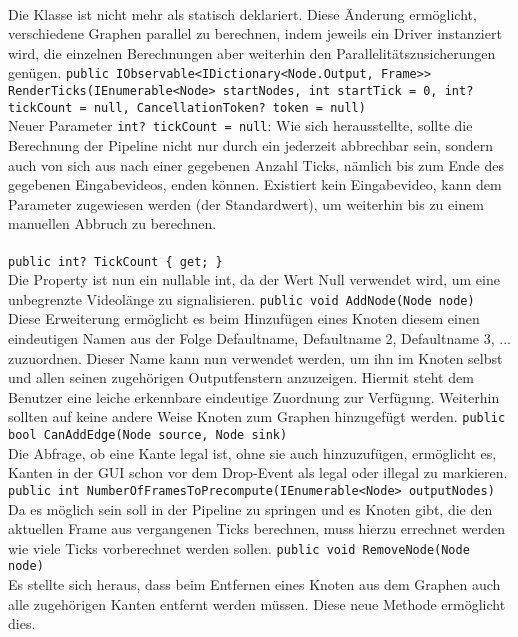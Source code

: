 \paragraph{}
\begin{itemize}
	\change Die Klasse ist nicht mehr als statisch deklariert. Diese Änderung ermöglicht, verschiedene Graphen parallel zu berechnen, indem jeweils ein Driver instanziert wird, die einzelnen Berechnungen aber weiterhin den Parallelitätszusicherungen genügen.
	\add \verb!public IObservable<IDictionary<Node.Output, Frame>> RenderTicks(IEnumerable<Node> startNodes, int startTick = 0, int? tickCount = null, CancellationToken? token = null)! \\
	Neuer Parameter \verb!int? tickCount = null!: Wie sich herausstellte, sollte die Berechnung der Pipeline nicht nur durch ein  jederzeit abbrechbar sein, sondern auch von sich aus nach einer gegebenen Anzahl Ticks, nämlich bis zum Ende des gegebenen Eingabevideos, enden können. Existiert kein Eingabevideo, kann dem Parameter  zugewiesen werden (der Standardwert), um weiterhin bis zu einem manuellen Abbruch zu berechnen.
\end{itemize}

\paragraph{}
\begin{itemize}
	\change \verb!public int? TickCount { get; }! \\
	Die Property ist nun ein nullable int, da der Wert Null verwendet wird, um eine unbegrenzte Videolänge zu signalisieren.
	\add \verb!public void AddNode(Node node)! \\
	Diese Erweiterung ermöglicht es beim Hinzufügen eines Knoten diesem einen eindeutigen Namen aus der Folge Defaultname, Defaultname 2, Defaultname 3, ... zuzuordnen. Dieser Name kann nun verwendet werden, um ihn im Knoten selbst und allen seinen zugehörigen Outputfenstern anzuzeigen. Hiermit steht dem Benutzer eine leiche erkennbare eindeutige Zuordnung zur Verfügung. Weiterhin sollten auf keine andere Weise Knoten zum Graphen hinzugefügt werden.
	\add \verb!public bool CanAddEdge(Node source, Node sink)! \\
	Die Abfrage, ob eine Kante legal ist, ohne sie auch hinzuzufügen, ermöglicht es, Kanten in der GUI schon vor dem Drop-Event als legal oder illegal zu markieren.
	\add \verb!public int NumberOfFramesToPrecompute(IEnumerable<Node> outputNodes)! \\
	Da es möglich sein soll in der Pipeline zu springen und es Knoten gibt, die den aktuellen Frame aus vergangenen Ticks berechnen, muss hierzu errechnet werden wie viele Ticks vorberechnet werden sollen.
	\add \verb!public void RemoveNode(Node node)! \\
	Es stellte sich heraus, dass beim Entfernen eines Knoten aus dem Graphen auch alle zugehörigen Kanten entfernt werden müssen. Diese neue Methode ermöglicht dies.
\end{itemize}

